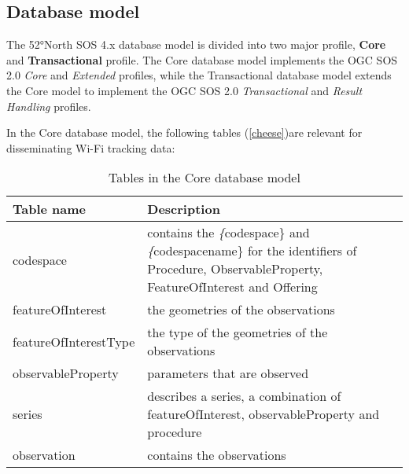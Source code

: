 \subsection{Database model}
The 52°North SOS 4.x database model is divided into two major profile,
\textbf{Core} and \textbf{Transactional} profile. The Core database model
implements the OGC SOS 2.0 \textit{Core} and \textit{Extended} profiles, while
the Transactional database model extends the Core model to implement the OGC SOS
2.0 \textit{Transactional} and \textit{Result Handling} profiles. 

In the Core database model, the following tables (\autoref{cheese})are relevant for disseminating Wi-Fi tracking data:

\begin{table}[]
\centering
\caption{Tables in the Core database model}
\label{cheese}
\begin{tabular}{@{}ll@{}}
\toprule
Table name                 & Description                                                                                                                                                \\ \midrule
codespace                  & contains the \textit\{codespace\} and \textit\{codespacename\} for the identifiers of Procedure, ObservableProperty, FeatureOfInterest and Offering        \\
featureOfInterest          & the geometries of the observations                                                                                                                         \\
featureOfInterestType      & the type of the geometries of the observations                                                                                                             \\
observableProperty         & parameters that are observed                                                                                                                               \\
series                     & describes a series, a combination of featureOfInterest, observableProperty and procedure                                                                   \\
observation                & contains the observations                                                                                                                                  \\

\end{tabular}
\end{table}
